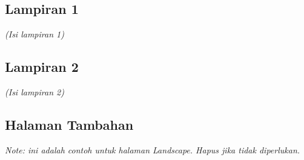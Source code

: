 \documentclass[a4paper,11pt,oneside]{report}
\begin{document}
\section*{Lampiran 1}
\textit{(Isi lampiran 1)}

\section*{Lampiran 2}
\textit{(Isi lampiran 2)}

\newpage
\begin{landscape}
\chapter*{Halaman Tambahan}
\noindent\textit{Note: ini adalah contoh untuk halaman Landscape. Hapus jika tidak diperlukan.}
\end{landscape}
\end{document}
